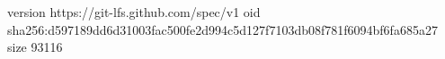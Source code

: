 version https://git-lfs.github.com/spec/v1
oid sha256:d597189dd6d31003fac500fe2d994c5d127f7103db08f781f6094bf6fa685a27
size 93116
